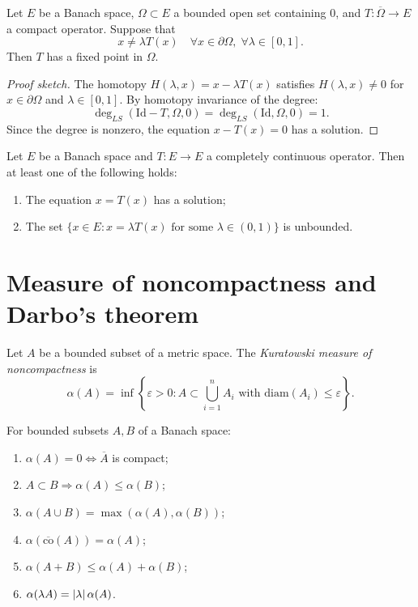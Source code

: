 \begin{theorem}\label{thm:leray-schauder}
Let $E$ be a Banach space, $\Omega \subset E$ a bounded open set containing $0$,
and $T : \overline{\Omega} \to E$ a compact operator. Suppose that
\[
    x \neq \lambda T(x) \quad \forall x \in \partial\Omega, \; \forall \lambda \in [0, 1].
\]
Then $T$ has a fixed point in $\Omega$.
\end{theorem}

\begin{proof}[Proof sketch]
The homotopy $H(\lambda, x) = x - \lambda T(x)$ satisfies $H(\lambda, x) \neq 0$
for $x \in \partial\Omega$ and $\lambda \in [0,1]$. By homotopy invariance of
the degree:
\[
    \deg_{LS}(\mathrm{Id} - T, \Omega, 0) = \deg_{LS}(\mathrm{Id}, \Omega, 0) = 1.
\]
Since the degree is nonzero, the equation $x - T(x) = 0$ has a solution.
\end{proof}

\begin{corollary}
Let $E$ be a Banach space and $T : E \to E$ a completely continuous operator.
Then at least one of the following holds:
\begin{enumerate}
    \item The equation $x = T(x)$ has a solution;
    \item The set $\{x \in E : x = \lambda T(x) \text{ for some } \lambda \in (0,1)\}$
          is unbounded.
\end{enumerate}
\end{corollary}

\section{Measure of noncompactness and Darbo's theorem}

\begin{definition}
Let $A$ be a bounded subset of a metric space. The \emph{Kuratowski measure of
noncompactness} is
\[
    \alpha(A) = \inf\left\{ \varepsilon > 0 : A \subset \bigcup_{i=1}^n A_i
    \text{ with } \mathrm{diam}(A_i) \leq \varepsilon \right\}.
\]
\end{definition}

\begin{proposition}
For bounded subsets $A, B$ of a Banach space:
\begin{enumerate}
    \item $\alpha(A) = 0 \Leftrightarrow \overline{A}$ is compact;
    \item $A \subset B \Rightarrow \alpha(A) \leq \alpha(B)$;
    \item $\alpha(A \cup B) = \max(\alpha(A), \alpha(B))$;
    \item $\alpha(\overline{\mathrm{co}}(A)) = \alpha(A)$;
    \item $\alpha(A + B) \leq \alpha(A) + \alpha(B)$;
    \item $\alpha(\lambda A) = \left| \lambda \right| \alpha(A)$.
\end{enumerate}
\end{proposition}

